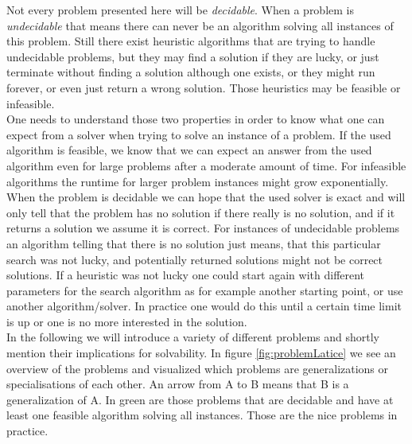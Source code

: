 Not every problem presented here will be \emph{decidable}. When a problem is \emph{undecidable} that means there can never be an algorithm solving all instances of this problem. Still there exist heuristic algorithms that are trying to handle undecidable problems, but they may find a solution if they are lucky, or just terminate without finding a solution although one exists, or they might run forever, or even just return a wrong solution. Those heuristics may be feasible or infeasible. \\
One needs to understand those two properties in order to know what one can expect from a solver when trying to solve an instance of a problem. If the used algorithm is feasible, we know that we can expect an answer from the used algorithm even for large problems after a moderate amount of time. For infeasible algorithms the runtime for larger problem instances might grow exponentially. \\
When the problem is decidable we can hope that the used solver is exact and will only tell that the problem has no solution if there really is no solution, and if it returns a solution we assume it is correct. For instances of undecidable problems an algorithm telling that there is no solution just means, that this particular search was not lucky, and potentially returned solutions might not be correct solutions. If a heuristic was not lucky one could start again with different parameters for the search algorithm as for example another starting point, or use another algorithm/solver. In practice one would do this until a certain time limit is up or one is no more interested in the solution.\\
In the following we will introduce a variety of different problems and shortly mention their implications for solvability. In figure \ref{fig:problemLatice} we see an overview of the problems and visualized which problems are generalizations or specialisations of each other. An arrow from A to B means that B is a generalization of A. In green are those problems that are decidable and have at least one feasible algorithm solving all instances. Those are the nice problems in practice.
